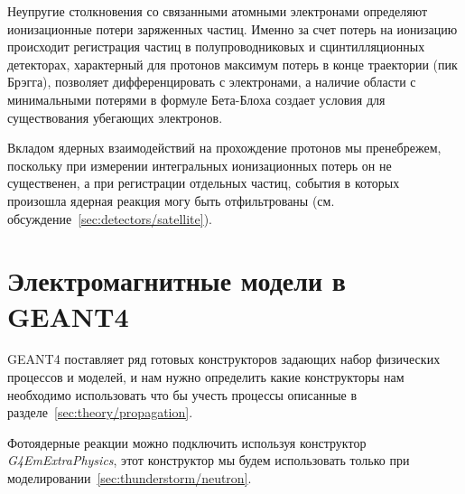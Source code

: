 Неупругие столкновения со связанными атомными электронами определяют ионизационные потери заряженных частиц. Именно за счет потерь на ионизацию происходит регистрация частиц в полупроводниковых и сцинтилляционных детекторах, характерный для протонов максимум потерь в конце траектории (пик Брэгга), позволяет дифференцировать с электронами, а наличие области с минимальными потерями в формуле Бета-Блоха создает условия для существования убегающих электронов.

Вкладом ядерных взаимодействий на прохождение протонов мы пренебрежем, поскольку при измерении интегральных ионизационных потерь он не существенен, а при регистрации отдельных частиц, события в которых произошла ядерная реакция могу быть отфильтрованы (см. обсуждение~\ref{sec:detectors/satellite}). 

\section{Электромагнитные модели в GEANT4 }\label{sec:theory/models}

GEANT4 поставляет ряд готовых конструкторов задающих набор физических процессов и моделей, и нам нужно определить какие конструкторы нам необходимо использовать что бы учесть процессы описанные в разделе~\ref{sec:theory/propagation}.

Фотоядерные реакции можно подключить используя конструктор \textit{G4EmExtraPhysics}, этот конструктор мы будем использовать только при моделировании~\ref{sec:thunderstorm/neutron}.

%
%
%
%
%
%
%
%
%
%
